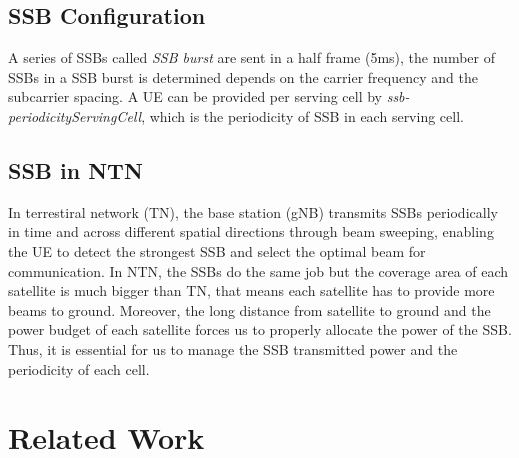 \subsection{SSB Configuration}
A series of SSBs called \textit{SSB burst} are sent in a half frame (5ms), the number of SSBs in a SSB burst is determined depends on the carrier frequency and the subcarrier spacing. A UE can be provided per serving cell by \textit{ssb-periodicityServingCell}, which is the periodicity of SSB in each serving cell. 

\subsection{SSB in NTN}
In terrestiral network (TN), the base station (gNB) transmits SSBs periodically in time and across different spatial directions through beam sweeping, enabling the UE to detect the strongest SSB and select the optimal beam for communication. In NTN, the SSBs do the same job but the coverage area of each satellite is much bigger than TN, that means each satellite has to provide more beams to ground. Moreover, the long distance from satellite to ground and the power budget of each satellite forces us to properly allocate the power of the SSB. Thus, it is essential for us to manage the SSB transmitted power and the periodicity of each cell.



\section{Related Work}
